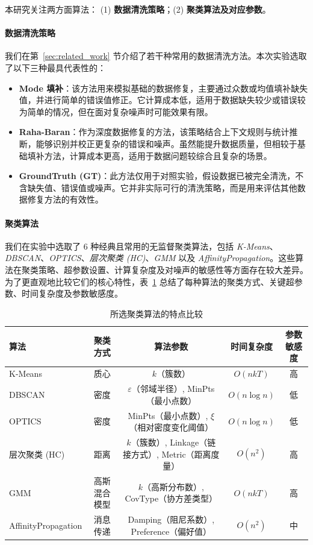 \documentclass[10pt]{article} %
\numberwithin{equation}{section}
\begin{document}
本研究关注两方面算法：
(1) \textbf{数据清洗策略}；(2) \textbf{聚类算法及对应参数}。

\paragraph{数据清洗策略}
我们在第~\ref{sec:related_work} 节介绍了若干种常用的数据清洗方法。本次实验选取了以下三种最具代表性的：
\begin{itemize}
	\item \textbf{Mode 填补}：该方法用来模拟基础的数据修复，主要通过众数或均值填补缺失值，并进行简单的错误值修正。它计算成本低，适用于数据缺失较少或错误较为简单的情况，但在面对复杂噪声时可能效果有限。
	\item \textbf{Raha-Baran}：作为深度数据修复的方法，该策略结合上下文规则与统计推断，能够识别并校正更复杂的错误和噪声。虽然能提升数据质量，但相较于基础填补方法，计算成本更高，适用于数据问题较综合且复杂的场景。
	\item \textbf{GroundTruth (GT)}：此方法仅用于对照实验，假设数据已被完全清洗，不含缺失值、错误值或噪声。它并非实际可行的清洗策略，而是用来评估其他数据修复方法的有效性。

\end{itemize}

\paragraph{聚类算法}
我们在实验中选取了 6 种经典且常用的无监督聚类算法，包括 \textit{K-Means}、\textit{DBSCAN}、\textit{OPTICS}、\textit{层次聚类 (HC)}、\textit{GMM} 以及 \textit{AffinityPropagation}。这些算法在聚类策略、超参数设置、计算复杂度及对噪声的敏感性等方面存在较大差异。为了更直观地比较它们的核心特性，表~\ref{tab:clustering_algorithms} 总结了每种算法的聚类方式、关键超参数、时间复杂度及参数敏感度。

\begin{table}[htbp]
    \centering
    \small %
    \begin{tabular}{lcccc}
        \toprule
        \textbf{算法} & \textbf{聚类方式} & \textbf{算法参数} & \textbf{时间复杂度} & \textbf{参数敏感度} \\
        \midrule
        K-Means & 质心 & $k$（簇数） & $O(nkT)$ & 高 \\
        DBSCAN & 密度 & $\varepsilon$（邻域半径）, MinPts（最小点数） & $O(n \log n)$ & 低 \\
        OPTICS & 密度 & MinPts（最小点数）, $\xi$（相对密度变化阈值） & $O(n \log n)$ & 低 \\
        层次聚类 (HC) & 距离 & $k$（簇数）, Linkage（链接方式）, Metric（距离度量） & $O(n^2)$ & 高 \\
        GMM & 高斯混合模型 & $k$（高斯分布数）, CovType（协方差类型） & $O(nkT)$ & 高 \\
        AffinityPropagation & 消息传递 & Damping（阻尼系数）, Preference（偏好值） & $O(n^2)$ & 中 \\
        \bottomrule
    \end{tabular}
    \caption{所选聚类算法的特点比较}
    \label{tab:clustering_algorithms}
\end{table}
\end{document}
